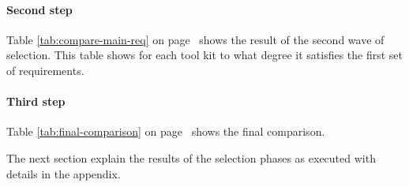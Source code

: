 \paragraph{Second step} Table \ref{tab:compare-main-req} on
page~\pageref{tab:compare-main-req} shows the result of the second wave of
selection. This table shows for each tool kit to what degree it satisfies the
first set of requirements. 

\paragraph{Third step} Table \ref{tab:final-comparison} on
page~\pageref{tab:final-comparison} shows the final comparison. 

The next section explain the results of the selection phases as executed with
details in the appendix.
